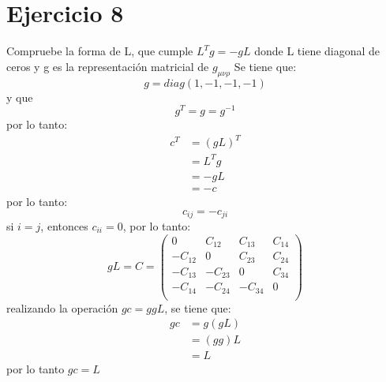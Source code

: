 \section*{Ejercicio 8}
Compruebe la forma de L, que cumple $L^Tg=-gL$ donde L tiene diagonal de ceros y g es la representación matricial de $g_{\mu \nu \rho}$
    Se tiene que:
    \begin{equation*}
        g=diag(1,-1,-1,-1)
    \end{equation*}
    y que
    \begin{equation*}
        g^T=g=g^{-1}
    \end{equation*}
    por lo tanto:
    \begin{align*}
        c^T&= (gL)^T \\
        &=L^T g \\
        &=-gL\\
        &=-c
    \end{align*}
    por lo tanto:
    \begin{equation*}
        c_{ij}=-c_{ji}
    \end{equation*}
    si $i=j$, entonces $c_{ii}=0$, por lo tanto:
    \begin{equation*}
        gL=C=\left(\begin{matrix}
            0 & C_{12} & C_{13} & C_{14} \\
            -C_{12} & 0 & C_{23} & C_{24} \\
            -C_{13} & -C_{23} & 0 & C_{34} \\
            -C_{14} & -C_{24} & -C_{34} & 0 \\
        \end{matrix}\right)
    \end{equation*}
    realizando la operación $gc=ggL$, se tiene que:
    \begin{align*}
        gc&=g(gL)\\
        &=(gg)L\\
        &=L
    \end{align*}
    por lo tanto $gc=L$